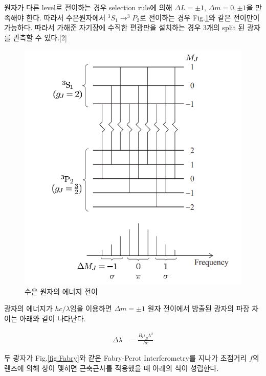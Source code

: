 \documentclass[%
 reprint,
 amsmath,amssymb,
 aps,
]{revtex4-2}
\begin{document}
원자가 다른 level로 전이하는 경우 selection rule에 의해 $\Delta L = \pm 1$, $\Delta m = 0, \pm1$을 만족해야 한다. 따라서 수은원자에서 $^{3}S_{1} \rightarrow ^{3}P_{2}$로 전이하는 경우 Fig.\ref{fig:Mercury}와 같은 전이만이 가능하다. 따라서 가해준 자기장에 수직한 편광판을 설치하는 경우 3개의 split 된 광자를 관측할 수 있다.[2] 

\begin{figure}[htbp]
	\includegraphics[width = 0.95\linewidth]{Mercury.png}%
	\caption{\label{fig:Mercury}수은 원자의 에너지 전이}
\end{figure}

광자의  에너지가 $hc/\lambda$임을 이용하면 $\Delta m = \pm 1$ 원자 전이에서 방출된 광자의 파장 차이는 아래와 같이 나타난다.

\begin{align}
	\Delta \lambda &= \frac{B\mu_{B}\lambda^{2}}{hc}
\end{align}

두 광자가 Fig.\ref{fig:Fabry}와 같은 Fabry-Perot Interferometry를 지나가 초점거리 $f$의 렌즈에 의해 상이 맺히면 근축근사를 적용했을 때 아래의 식이 성립한다. 
\end{document}

